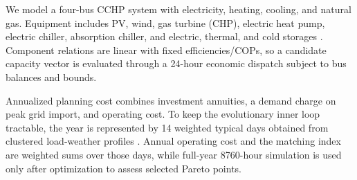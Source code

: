 We model a four-bus CCHP system with electricity, heating, cooling, and natural gas. Equipment includes PV, wind, gas turbine (CHP), electric heat pump, electric chiller, absorption chiller, and electric, thermal, and cold storages \cite{hilpert2018oemof,mancarella2014mes}. Component relations are linear with fixed efficiencies/COPs, so a candidate capacity vector is evaluated through a 24-hour economic dispatch subject to bus balances and bounds.

Annualized planning cost combines investment annuities, a demand charge on peak grid import, and operating cost. To keep the evolutionary inner loop tractable, the year is represented by 14 weighted typical days obtained from clustered load-weather profiles \cite{kotzur2018impact,dominguez2012selection}. Annual operating cost and the matching index are weighted sums over those days, while full-year 8760-hour simulation is used only after optimization to assess selected Pareto points.
